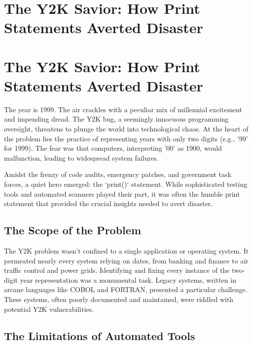 \documentclass{article}
\begin{document}
{{{{%
\newpage

\section*{The Y2K Savior: How Print Statements Averted Disaster} %
\label{chapter-8-2-The_Y2K_Savior__How_Print_Statements_Ave}

\section*{The Y2K Savior: How Print Statements Averted Disaster}

The year is 1999. The air crackles with a peculiar mix of millennial excitement and impending dread. The Y2K bug, a seemingly innocuous programming oversight, threatens to plunge the world into technological chaos. At the heart of the problem lies the practice of representing years with only two digits (e.g., '99' for 1999). The fear was that computers, interpreting '00' as 1900, would malfunction, leading to widespread system failures.

Amidst the frenzy of code audits, emergency patches, and government task forces, a quiet hero emerged: the `print()` statement. While sophisticated testing tools and automated scanners played their part, it was often the humble print statement that provided the crucial insights needed to avert disaster.

\subsection*{The Scope of the Problem}

The Y2K problem wasn't confined to a single application or operating system. It permeated nearly every system relying on dates, from banking and finance to air traffic control and power grids. Identifying and fixing every instance of the two-digit year representation was a monumental task. Legacy systems, written in arcane languages like COBOL and FORTRAN, presented a particular challenge. These systems, often poorly documented and maintained, were riddled with potential Y2K vulnerabilities.

\subsection*{The Limitations of Automated Tools}

}}}}
\end{document}
